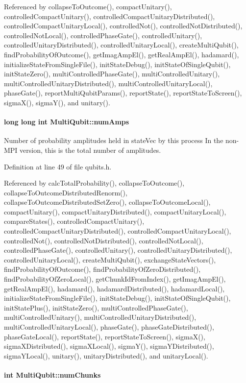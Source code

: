 Referenced by collapseToOutcome(), compactUnitary(), controlledCompactUnitary(), controlledCompactUnitaryDistributed(), controlledCompactUnitaryLocal(), controlledNot(), controlledNotDistributed(), controlledNotLocal(), controlledPhaseGate(), controlledUnitary(), controlledUnitaryDistributed(), controlledUnitaryLocal(), createMultiQubit(), findProbabilityOfOutcome(), getImagAmpEl(), getRealAmpEl(), hadamard(), initializeStateFromSingleFile(), initStateDebug(), initStateOfSingleQubit(), initStateZero(), multiControlledPhaseGate(), multiControlledUnitary(), multiControlledUnitaryDistributed(), multiControlledUnitaryLocal(), phaseGate(), reportMultiQubitParams(), reportState(), reportStateToScreen(), sigmaX(), sigmaY(), and unitary().\hypertarget{structMultiQubit_ae16f47d8b725c914fb7f66b6498d79db}{
\paragraph[{numAmps}]{\setlength{\rightskip}{0pt plus 5cm}long long int {\bf MultiQubit::numAmps}}\hfill}
\label{structMultiQubit_ae16f47d8b725c914fb7f66b6498d79db}


Number of probability amplitudes held in stateVec by this process In the non-\/MPI version, this is the total number of amplitudes. 

Definition at line 49 of file qubits.h.

Referenced by calcTotalProbability(), collapseToOutcome(), collapseToOutcomeDistributedRenorm(), collapseToOutcomeDistributedSetZero(), collapseToOutcomeLocal(), compactUnitary(), compactUnitaryDistributed(), compactUnitaryLocal(), compareStates(), controlledCompactUnitary(), controlledCompactUnitaryDistributed(), controlledCompactUnitaryLocal(), controlledNot(), controlledNotDistributed(), controlledNotLocal(), controlledPhaseGate(), controlledUnitary(), controlledUnitaryDistributed(), controlledUnitaryLocal(), createMultiQubit(), exchangeStateVectors(), findProbabilityOfOutcome(), findProbabilityOfZeroDistributed(), findProbabilityOfZeroLocal(), getChunkIdFromIndex(), getImagAmpEl(), getRealAmpEl(), hadamard(), hadamardDistributed(), hadamardLocal(), initializeStateFromSingleFile(), initStateDebug(), initStateOfSingleQubit(), initStatePlus(), initStateZero(), multiControlledPhaseGate(), multiControlledUnitary(), multiControlledUnitaryDistributed(), multiControlledUnitaryLocal(), phaseGate(), phaseGateDistributed(), phaseGateLocal(), reportState(), reportStateToScreen(), sigmaX(), sigmaXDistributed(), sigmaXLocal(), sigmaY(), sigmaYDistributed(), sigmaYLocal(), unitary(), unitaryDistributed(), and unitaryLocal().\hypertarget{structMultiQubit_acd43f2f57991709c9e94f73662c972b2}{
\paragraph[{numChunks}]{\setlength{\rightskip}{0pt plus 5cm}int {\bf MultiQubit::numChunks}}\hfill}
\label{structMultiQubit_acd43f2f57991709c9e94f73662c972b2}



